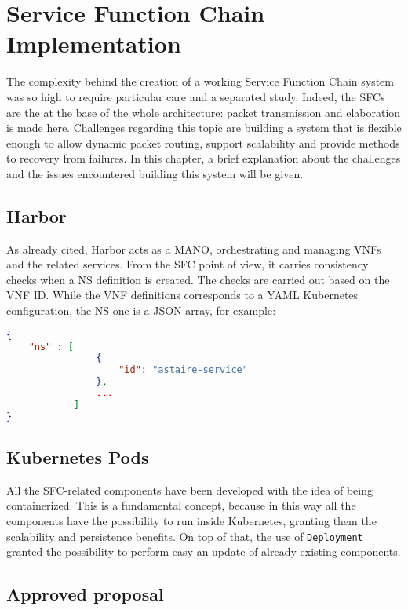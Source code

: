 \chapter{Service Function Chain Implementation} 
\label{chap:vnf_ns_impl}

The complexity behind the creation of a working Service Function Chain system
was so high to require particular care and a separated study. Indeed, the SFCs
are the at the base of the whole architecture: packet transmission and
elaboration is made here. Challenges regarding this topic are building a system
that is flexible enough to allow dynamic packet routing, support scalability and
provide methods to recovery from failures. In this chapter, a brief explanation
about the challenges and the issues encountered building this system will be
given.

\section{Harbor}

As already cited, Harbor acts as a MANO, orchestrating and managing VNFs and the
related services. From the SFC point of view, it carries consistency checks when
a NS definition is created. The checks are carried out based on the VNF ID.
While the VNF definitions corresponds to a YAML Kubernetes configuration, the NS
one is a JSON array, for example:

\begin{lstlisting}[caption={Example of SFC definition}, captionpos=b,
                   language=json, label=chap:impl:lst:sfcexample]
{
    "ns" : [
                {
                    "id": "astaire-service"
                },
                ...
            ]
}
\end{lstlisting}



\section{Kubernetes Pods}

All the SFC-related components have been developed with the idea of being
containerized. This is a fundamental concept, because in this way all the
components have the possibility to run inside Kubernetes, granting them the
scalability and persistence benefits. On top of that, the use of
\verb!Deployment! granted the possibility to perform easy an update of already
existing components.

\section{Approved proposal}

